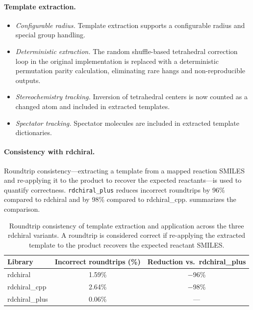 \documentclass[12pt]{article}
\begin{document}
\paragraph{Template extraction.}
\begin{itemize}[leftmargin=*]
  \item \emph{Configurable radius.}  Template extraction supports a
        configurable radius and special group handling.
  \item \emph{Deterministic extraction.}  The random shuffle-based
        tetrahedral correction loop in the original implementation is
        replaced with a deterministic permutation parity calculation,
        eliminating rare hangs and non-reproducible outputs.
  \item \emph{Stereochemistry tracking.}  Inversion of tetrahedral
        centers is now counted as a changed atom and included in extracted
        templates.
  \item \emph{Spectator tracking.}  Spectator molecules are included
        in extracted template dictionaries.
\end{itemize}

\paragraph{Consistency with rdchiral.}
Roundtrip consistency---extracting a template from a mapped reaction
SMILES and re-applying it to the product to recover the expected
reactants---is used to quantify correctness.  \texttt{rdchiral\_plus}
reduces incorrect roundtrips by 96\% compared to rdchiral and by 98\%
compared to rdchiral\_cpp.   summarizes the
comparison.

\begin{table}[htbp]
  \centering
  \caption{Roundtrip consistency of template extraction and application
    across the three rdchiral variants.  A roundtrip is considered
    correct if re-applying the extracted template to the product
    recovers the expected reactant SMILES.}
  \label{tab:rdchiral}
  \begin{tabular}{lcc}
    \toprule
    \textbf{Library} & \textbf{Incorrect roundtrips (\%)} & \textbf{Reduction vs.\ rdchiral\_plus} \\
    \midrule
    rdchiral         & 1.59\%                          & $-$96\%                                \\
    rdchiral\_cpp    & 2.64\%                          & $-$98\%                                \\
    rdchiral\_plus   & 0.06\%                          & ---                                    \\
    \bottomrule
  \end{tabular}
\end{table}
\end{document}
